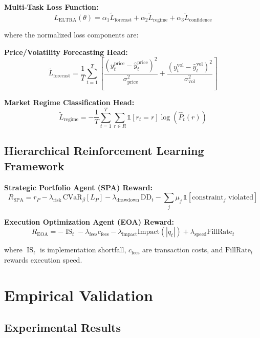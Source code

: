 \documentclass[11pt,a4paper]{article}
\begin{document}
\textbf{Multi-Task Loss Function:}
\begin{equation}
L_{\text{ELTRA}}(\theta) = \alpha_1 \tilde{L}_{\text{forecast}} + \alpha_2 \tilde{L}_{\text{regime}} + \alpha_3 \tilde{L}_{\text{confidence}}
\end{equation}

where the normalized loss components are:

\textbf{Price/Volatility Forecasting Head:}
\begin{equation}
\tilde{L}_{\text{forecast}} = \frac{1}{T} \sum_{t=1}^{T} \left[\frac{(y_t^{\text{price}} - \hat{y}_t^{\text{price}})^2}{\sigma_{\text{price}}^2} + \frac{(y_t^{\text{vol}} - \hat{y}_t^{\text{vol}})^2}{\sigma_{\text{vol}}^2}\right]
\end{equation}

\textbf{Market Regime Classification Head:}
\begin{equation}
\tilde{L}_{\text{regime}} = -\frac{1}{T} \sum_{t=1}^{T} \sum_{r \in R} \mathbb{1}[r_t = r] \log(\hat{P}_t(r))
\end{equation}

\subsection{Hierarchical Reinforcement Learning Framework}

\textbf{Strategic Portfolio Agent (SPA) Reward:}
\begin{equation}
R_{\text{SPA}} = r_P - \lambda_{\text{risk}}\,\text{CVaR}_{\beta}[L_P] - \lambda_{\text{drawdown}}\,\text{DD}_t - \sum_j \mu_j\,\mathbb{1}[\text{constraint}_j\text{ violated}]
\end{equation}

\textbf{Execution Optimization Agent (EOA) Reward:}
\begin{equation}
R_{\text{EOA}} = -\operatorname{IS}_t - \lambda_{\text{fees}}c_{\text{fees}} - \lambda_{\text{impact}}\text{Impact}(|q_t|) + \lambda_{\text{speed}}\text{FillRate}_t
\end{equation}

where $\operatorname{IS}_t$ is implementation shortfall, $c_{\text{fees}}$ are transaction costs, and $\text{FillRate}_t$ rewards execution speed.

\section{Empirical Validation}

\subsection{Experimental Results}
\end{document}
